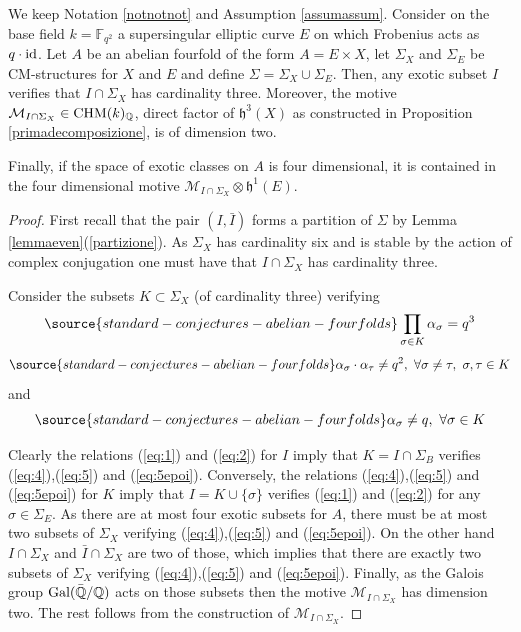 \begin{lemma}
\notready
We keep Notation \ref{notnotnot} and Assumption \ref{assumassum}. Consider on the base field $k=\mathbb{F}_{q^2}$   a supersingular elliptic curve $E$  on which   Frobenius acts as $q\cdot \mathrm{id}$.
Let $A$ be an abelian fourfold of the form $ A=E\times X$, let  $\Sigma_X$ and $ \Sigma_E$ be CM-structures for $X$ and $E$ and define  $\Sigma=\Sigma_X \cup \Sigma_E$. Then, any exotic subset $I$ verifies that $I\cap \Sigma_X$ has cardinality three. Moreover,  the motive $\mathcal{M}_{I\cap \Sigma_X} \in\mathrm{CHM} (k)_{\mathbb{Q}}$, direct factor of $\mathfrak{h}^3(X)$ as constructed in Proposition \ref{primadecomposizione}, is of dimension two.

Finally, if the space of exotic classes on $A$ is four dimensional, it is contained in the four dimensional motive $\mathcal{M}_{I\cap \Sigma_X} \otimes \mathfrak{h}^1(E)$.
\end{lemma}
\begin{proof}
First recall that  the pair $(I,\bar{I})$ forms a partition of $\Sigma$ by Lemma \ref{lemmaeven}(\ref{partizione}). As $ \Sigma_X$ has cardinality six and is stable by the action of complex conjugation one must have that $I\cap \Sigma_X$ has cardinality three.


Consider the subsets $K \subset \Sigma_X$ (of cardinality three) verifying
\begin{equation} \label{eq:4}
\source{standard-conjectures-abelian-fourfolds}
\prod_{\sigma \in K} \alpha_\sigma =q^3
\end{equation}
\begin{equation} \label{eq:5}
\source{standard-conjectures-abelian-fourfolds}
 \alpha_\sigma \cdot \alpha_\tau \neq q^2, \, \, \forall \sigma \neq \tau, \,\, \sigma,\tau \in K
\end{equation}
and
\begin{equation} \label{eq:5epoi}
\source{standard-conjectures-abelian-fourfolds}
 \alpha_\sigma  \neq q,  \,\, \forall \sigma\in K
\end{equation}

Clearly the relations (\ref{eq:1}) and (\ref{eq:2}) for $I$ imply that $K=I\cap \Sigma_B$ verifies (\ref{eq:4}),(\ref{eq:5}) and (\ref{eq:5epoi}). Conversely, the relations (\ref{eq:4}),(\ref{eq:5}) and (\ref{eq:5epoi})  for $K$ imply that $I=K\cup \{\sigma\}$ verifies (\ref{eq:1}) and (\ref{eq:2}) for any $\sigma \in \Sigma_E$. As there are at most four exotic subsets for $A$, there must be at most two subsets of $\Sigma_X$ verifying  (\ref{eq:4}),(\ref{eq:5}) and (\ref{eq:5epoi}).  On the other hand $I\cap \Sigma_X$  and $\bar{I}\cap \Sigma_X$ are two of those, which implies that there are exactly  two subsets of $\Sigma_X$  verifying (\ref{eq:4}),(\ref{eq:5}) and (\ref{eq:5epoi}).
Finally, as the Galois group $\textnormal{Gal}(\bar{\mathbb{Q}}/\mathbb{Q})$ acts on those subsets then the motive $\mathcal{M}_{I\cap \Sigma_X}$ has dimension two.
The rest follows from the construction of $\mathcal{M}_{I\cap \Sigma_X}$.
\end{proof}
